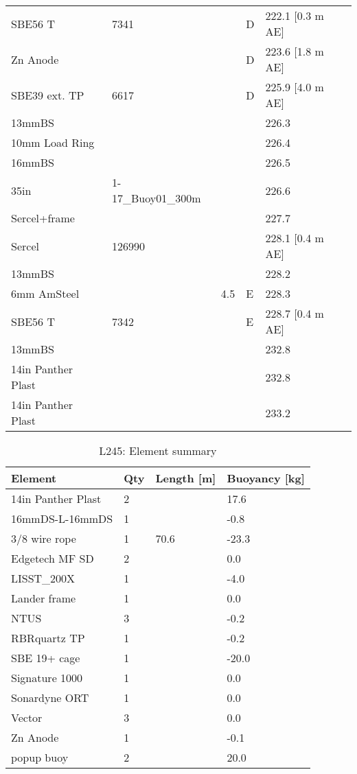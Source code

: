 \documentclass{article}
\begin{document}
\begin{table}[!htbp]
\begin{tabular}{lllll}
SBE56 T & 7341 &  & D & 222.1 [0.3 m AE] \\
Zn Anode &  &  & D & 223.6 [1.8 m AE] \\
SBE39 ext. TP & 6617 &  & D & 225.9 [4.0 m AE] \\
13mmBS &  &  &  & 226.3 \\
10mm Load Ring &  &  &  & 226.4 \\
16mmBS &  &  &  & 226.5 \\
35in & 1-17\_Buoy01\_300m &  &  & 226.6 \\
Sercel+frame &  &  &  & 227.7 \\
Sercel & 126990 &  &  & 228.1 [0.4 m AE] \\
13mmBS &  &  &  & 228.2 \\
6mm AmSteel &  & 4.5 & E & 228.3 \\
SBE56 T & 7342 &  & E & 228.7 [0.4 m AE] \\
13mmBS &  &  &  & 232.8 \\
14in Panther Plast &  &  &  & 232.8 \\
14in Panther Plast &  &  &  & 233.2 \\
\bottomrule
\end{tabular}
\end{table}

\begin{table}[!htbp]
\centering
\caption{L245: Element summary}
\begin{tabular}{llll}
\toprule
Element & Qty & Length [m] & Buoyancy [kg] \\
\midrule
14in Panther Plast & 2 &  & 17.6 \\
16mmDS-L-16mmDS & 1 &  & -0.8 \\
3/8 wire rope & 1 & 70.6 & -23.3 \\
Edgetech MF SD & 2 &  & 0.0 \\
LISST\_200X & 1 &  & -4.0 \\
Lander frame & 1 &  & 0.0 \\
NTUS & 3 &  & -0.2 \\
RBRquartz TP & 1 &  & -0.2 \\
SBE 19+ cage & 1 &  & -20.0 \\
Signature 1000 & 1 &  & 0.0 \\
Sonardyne ORT & 1 &  & 0.0 \\
Vector & 3 &  & 0.0 \\
Zn Anode & 1 &  & -0.1 \\
popup buoy & 2 &  & 20.0 \\
\bottomrule
\end{tabular}
\end{table}
\end{document}
